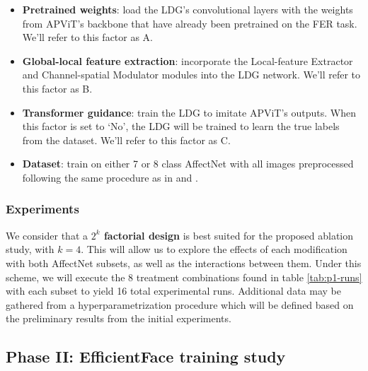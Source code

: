 \documentclass[../main.tex]{subfiles}
\begin{document}
\begin{itemize}
    \item \textbf{Pretrained weights}: load the LDG's convolutional layers with the weights from APViT's backbone that have already been pretrained on the FER task. We'll refer to this factor as A.

    \item \textbf{Global-local feature extraction}: incorporate the Local-feature Extractor and Channel-spatial Modulator modules into the LDG network. We'll refer to this factor as B.

    \item \textbf{Transformer guidance}: train the LDG to imitate APViT's outputs. When this factor is set to `No', the LDG will be trained to learn the true labels from the dataset. We'll refer to this factor as C.

    \item \textbf{Dataset}: train on either 7 or 8 class AffectNet with all images preprocessed following the same procedure as in \cite{eff-face2021} and \cite{apvit2023}. %
    
\end{itemize}


\subsubsection{Experiments}

We consider that a \textbf{$2^k$ factorial design} is best suited for the proposed ablation study, with $k=4$.
This will allow us to explore the effects of each modification with both AffectNet subsets, as well as the interactions between them.
Under this scheme, we will execute the 8 treatment combinations found in table \ref{tab:p1-runs} with each subset to yield 16 total experimental runs.
Additional data may be gathered from a hyperparametrization procedure which will be defined based on the preliminary results from the initial experiments.



\subsection{Phase II: EfficientFace training study}
\end{document}
